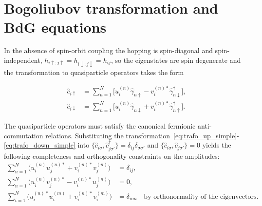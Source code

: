 \documentclass[11pt,a4paper,twoside,openany]{report}
\begin{document}
\section{Bogoliubov transformation and BdG equations}

In the absence of spin-orbit coupling the hopping is spin-diagonal and spin-independent, \(h_{i\uparrow;j\uparrow}=h_{i\downarrow;j\downarrow}=h_{ij}\), so the eigenstates are spin degenerate and the transformation to quasiparticle operators takes the form


\begin{align}
  \hat{c}_{i\uparrow} &= \sum_{n=1}^{N} \bigl[ u_{i}^{(n)} \hat{\gamma}_{n\uparrow} - v_{i}^{(n)*} \hat{\gamma}_{n\downarrow}^\dagger \bigr], \label{eq:trafo_up_simple} \\
  \hat{c}_{i\downarrow} &= \sum_{n=1}^{N} \bigl[ u_{i}^{(n)} \hat{\gamma}_{n\downarrow} + v_{i}^{(n)*} \hat{\gamma}_{n\uparrow}^\dagger \bigr]. \label{eq:trafo_down_simple}
\end{align}

The quasiparticle operators must satisfy the canonical fermionic anti-commutation relations.  Substituting the transformation~\eqref{eq:trafo_up_simple}-\eqref{eq:trafo_down_simple} into \(\{\hat{c}_{i\sigma},\hat{c}_{j\sigma'}^\dagger\}=\delta_{ij}\delta_{\sigma\sigma'}\) and \(\{\hat{c}_{i\sigma},\hat{c}_{j\sigma'}\}=0\) yields the following completeness and orthogonality constraints on the amplitudes:
\begin{align}
  \sum_{n=1}^{N} \bigl( u_{i}^{(n)} u_{j}^{(n)*} + v_{i}^{(n)*} v_{j}^{(n)} \bigr) &= \delta_{ij}, \label{eq:completeness1} \\
  \sum_{n=1}^{N} \bigl( u_{i}^{(n)} v_{j}^{(n)*} - v_{i}^{(n)*} u_{j}^{(n)} \bigr) &= 0, \label{eq:ortho1} \\
  \sum_{i=1}^{N} \bigl( u_{i}^{(n)*} u_{i}^{(m)} + v_{i}^{(n)*} v_{i}^{(m)} \bigr) &= \delta_{nm}\quad\text{by orthonormality of the eigenvectors.}\label{eq:ortho2}
\end{align}
\end{document}

